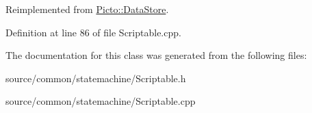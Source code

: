 Reimplemented from \hyperlink{class_picto_1_1_data_store_a8aa2e93b4249fc189ae7e0b9317efd1c}{Picto\-::\-Data\-Store}.



Definition at line 86 of file Scriptable.\-cpp.



The documentation for this class was generated from the following files\-:\begin{DoxyCompactItemize}
\item 
source/common/statemachine/Scriptable.\-h\item 
source/common/statemachine/Scriptable.\-cpp\end{DoxyCompactItemize}
